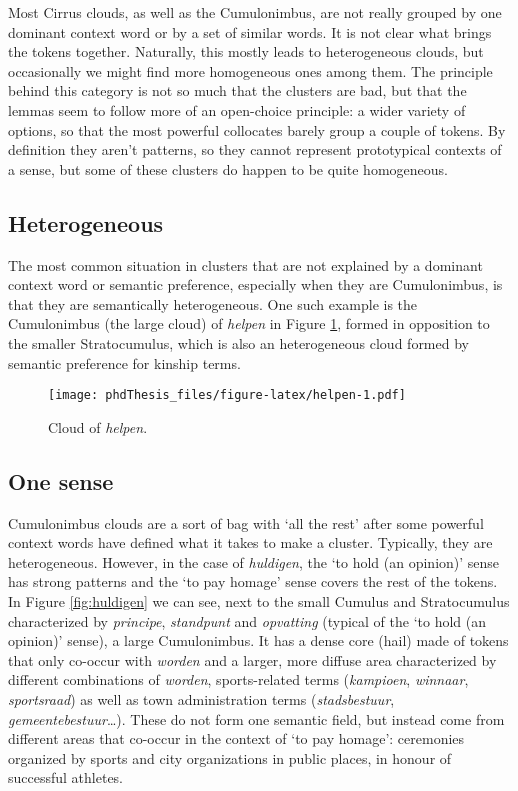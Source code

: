 \documentclass[
]{book}
\begin{document}
Most Cirrus clouds, as well as the Cumulonimbus, are not really grouped by one dominant context word or by a set of similar words. It is not clear what brings the tokens together. Naturally, this mostly leads to heterogeneous clouds, but occasionally we might find more homogeneous ones among them. The principle behind this category is not so much that the clusters are bad, but that the lemmas seem to follow more of an open-choice principle: a wider variety of options, so that the most powerful collocates barely group a couple of tokens. By definition they aren't patterns, so they cannot represent prototypical contexts of a sense, but some of these clusters do happen to be quite homogeneous.

\hypertarget{heterogeneous-2}{%
\subsection{Heterogeneous}\label{heterogeneous-2}}

The most common situation in clusters that are not explained by a dominant context word or semantic preference, especially when they are Cumulonimbus, is that they are semantically heterogeneous. One such example is the Cumulonimbus (the large cloud) of \emph{helpen} in Figure \ref{fig:helpen}, formed in opposition to the smaller Stratocumulus, which is also an heterogeneous cloud formed by semantic preference for kinship terms.



\begin{figure}
\centering
\texttt{[image: phdThesis\_files/figure-latex/helpen-1.pdf]}
\caption{\label{fig:helpen}Cloud of \emph{helpen}.}
\end{figure}

\hypertarget{one-sense-2}{%
\subsection{One sense}\label{one-sense-2}}

Cumulonimbus clouds are a sort of bag with `all the rest' after some powerful context words have defined what it takes to make a cluster. Typically, they are heterogeneous. However, in the case of \emph{huldigen}, the `to hold (an opinion)' sense has strong patterns and the `to pay homage' sense covers the rest of the tokens. In Figure \ref{fig:huldigen} we can see, next to the small Cumulus and Stratocumulus characterized by \emph{principe}, \emph{standpunt} and \emph{opvatting} (typical of the `to hold (an opinion)' sense), a large Cumulonimbus. It has a dense core (hail) made of tokens that only co-occur with \emph{worden} and a larger, more diffuse area characterized by different combinations of \emph{worden}, sports-related terms (\emph{kampioen}, \emph{winnaar}, \emph{sportsraad}) as well as town administration terms (\emph{stadsbestuur}, \emph{gemeentebestuur}\ldots). These do not form one semantic field, but instead come from different areas that co-occur in the context of `to pay homage': ceremonies organized by sports and city organizations in public places, in honour of successful athletes.
\end{document}
